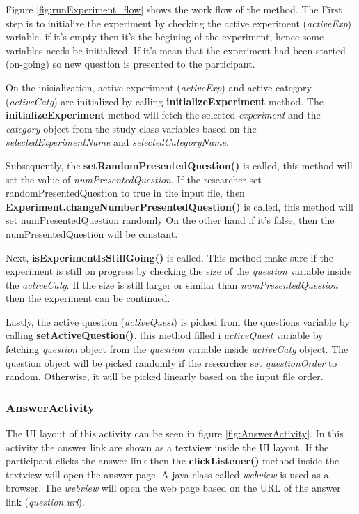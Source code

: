 Figure \ref{fig:runExperiment_flow} shows the work flow of the method. The First step is to initialize the experiment by checking the active experiment (\textit{activeExp}) variable.
 if it's empty then it's the begining of the experiment, hence some variables needs be initialized. If it's mean that the experiment had been started (on-going)
 so new question is presented to the participant.


On the inisialization, active experiment (\textit{activeExp}) and active category (\textit{activeCatg}) are initialized by calling \textbf{initializeExperiment} method.
The \textbf{initializeExperiment} method will fetch the selected \textit{experiment} and the
\textit{category} object from the study class variables based on the \textit{selectedExperimentName} and \textit{selectedCategoryName}.


Subsequently, the \textbf{setRandomPresentedQuestion()} is called, this method will set the value of \textit{numPresentedQuestion}.
If the researcher set randomPresentedQuestion to true in the input file, then \textbf{Experiment.changeNumberPresentedQuestion()} is called, this method will set numPresentedQuestion randomly
On the other hand if it's false, then the numPresentedQuestion will be constant.

Next, \textbf{isExperimentIsStillGoing()} is called. This method make sure if the experiment is still on progress by checking the size of the
\textit{question} variable inside the \textit{activeCatg}. If the size is still larger or similar than \textit{numPresentedQuestion} then the experiment can be continued.

Lastly, the active question (\textit{activeQuest}) is picked from the questions variable by calling \textbf{setActiveQuestion()}. this method filled
 i \textit{activeQuest} variable by fetching \textit{question} object from the \textit{question} variable inside \textit{activeCatg} object.
  The question object will be picked randomly if the researcher set \textit{questionOrder} to random. Otherwise, it will be picked linearly based on
  the input file order.


\subsubsection{AnswerActivity}
The UI layout of this activity can be seen in figure \ref{fig:AnswerActivity}.
In this activity the answer link are shown as a textview inside the UI layout. If the participant clicks the answer
link then the \textbf{clickListener()} method inside the textview will open the answer page.
A java class called \textit{webview} is used as a browser. The \textit{webview} will open the web page based on the URL of the answer link (\textit{question.url}).

